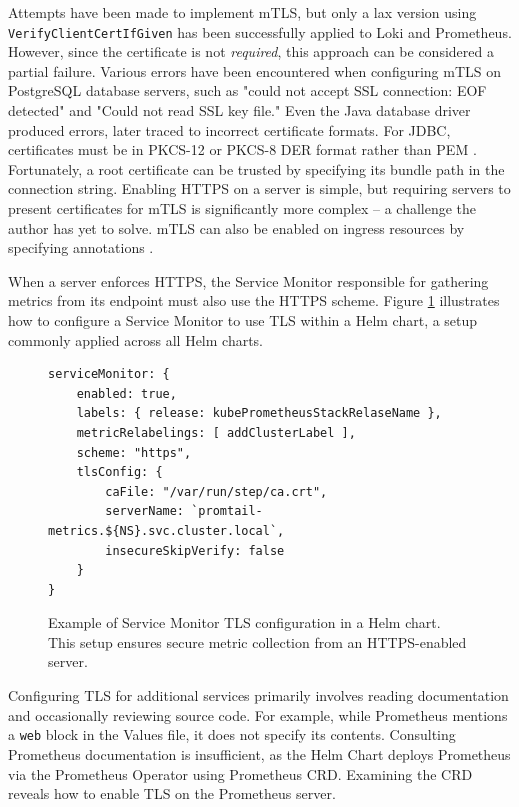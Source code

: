 Attempts have been made to implement mTLS, but only a lax version using \texttt{VerifyClientCertIfGiven} has been successfully applied to Loki and Prometheus. However, since the certificate is not \textit{required}, this approach can be considered a partial failure. Various errors have been encountered when configuring mTLS on PostgreSQL database servers, such as "could not accept SSL connection: EOF detected" and "Could not read SSL key file." Even the Java database driver produced errors, later traced to incorrect certificate formats. For JDBC, certificates must be in PKCS-12 or PKCS-8 DER format rather than PEM \parencite{PostgreSQLJDBC}. Fortunately, a root certificate can be trusted by specifying its bundle path in the connection string. Enabling HTTPS on a server is simple, but requiring servers to present certificates for mTLS is significantly more complex -- a challenge the author has yet to solve. mTLS can also be enabled on ingress resources by specifying annotations \parencite{KubernetesIngressNGINX}.

When a server enforces HTTPS, the Service Monitor responsible for gathering metrics from its endpoint must also use the HTTPS scheme. Figure \ref{fig:service_monitor_tls} illustrates how to configure a Service Monitor to use TLS within a Helm chart, a setup commonly applied across all Helm charts.

\begin{figure}[h]
    \centering
\begin{verbatim}
serviceMonitor: {
    enabled: true,
    labels: { release: kubePrometheusStackRelaseName },
    metricRelabelings: [ addClusterLabel ],
    scheme: "https",
    tlsConfig: {
        caFile: "/var/run/step/ca.crt",
        serverName: `promtail-metrics.${NS}.svc.cluster.local`,
        insecureSkipVerify: false
    }
}
\end{verbatim}
\caption{Example of Service Monitor TLS configuration in a Helm chart. This setup ensures secure metric collection from an HTTPS-enabled server.}
    \label{fig:service_monitor_tls}
\end{figure}

Configuring TLS for additional services primarily involves reading documentation and occasionally reviewing source code. For example, while Prometheus mentions a \texttt{web} block in the Values file, it does not specify its contents. Consulting Prometheus documentation is insufficient, as the Helm Chart deploys Prometheus via the Prometheus Operator using Prometheus CRD. Examining the CRD reveals how to enable TLS on the Prometheus server.

